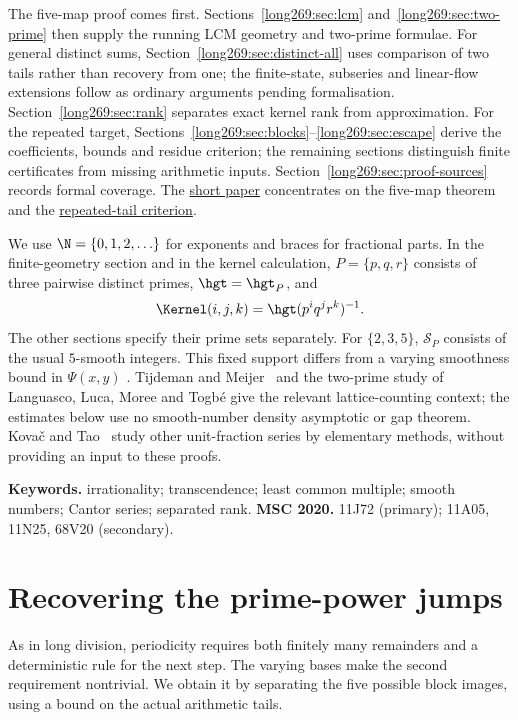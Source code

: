 The five-map proof comes first. Sections~\ref{long269:sec:lcm}
and~\ref{long269:sec:two-prime} then supply the running LCM geometry and
two-prime formulae. For general distinct sums,
Section~\ref{long269:sec:distinct-all} uses comparison of two tails rather
than recovery from one; the finite-state, subseries and linear-flow
extensions follow as ordinary arguments pending formalisation.
Section~\ref{long269:sec:rank} separates exact kernel rank from approximation.
For the repeated target, Sections~\ref{long269:sec:blocks}--\ref{long269:sec:escape}
derive the coefficients, bounds and residue criterion; the remaining
sections distinguish finite certificates from missing arithmetic inputs.
Section~\ref{long269:sec:proof-sources} records formal coverage. The
\href{erdos-269-three-prime-running-lcm.pdf\#r4-five-map-theorem}{short paper}
concentrates on the five-map theorem and the
\href{erdos-269-three-prime-running-lcm.pdf\#r4-repeated-criterion}{repeated-tail criterion}.

We use $\N=\{0,1,2,\ldots\}$ for exponents and braces for fractional parts.
In the finite-geometry section and in the kernel calculation, $P=\{p,q,r\}$ consists
of three pairwise distinct primes, $\hgt=\hgt_P$, and
\[
 \Kernel(i,j,k)=\hgt(p^iq^jr^k)^{-1}.
\]
The other sections specify their prime sets separately. For $\{2,3,5\}$,
$\mathcal S_P$ consists of the usual $5$-smooth integers. This fixed support
differs from a varying smoothness bound in $\Psi(x,y)$
\cite{hildebrand1986}. Tijdeman and Meijer~\cite[Sections~1--4]{tijdemanmeijer1974}
and the two-prime study of Languasco, Luca, Moree and Togb\'e
\cite{languasco2025} give the relevant lattice-counting context; the
estimates below use no smooth-number density asymptotic or gap theorem.
Kova\v{c} and Tao~\cite{kovactao2024} study other unit-fraction series by
elementary methods, without providing an input to these proofs.

\medskip
\noindent\textbf{Keywords.} irrationality; transcendence; least common
multiple; smooth numbers; Cantor series; separated rank.
\qquad\textbf{MSC 2020.} 11J72 (primary); 11A05, 11N25, 68V20 (secondary).

\section{Recovering the prime-power jumps}\label{long269:sec:distinct-235}
As in long division, periodicity requires both finitely many remainders
and a deterministic rule for the next step. The varying bases make the
second requirement nontrivial. We obtain it by separating the five
possible block images, using a bound on the actual arithmetic tails.

